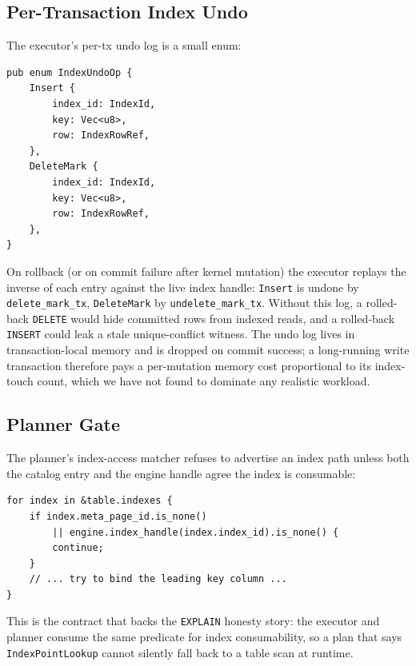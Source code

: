 \subsection{Per-Transaction Index Undo}
The executor's per-tx undo log is a small enum:

\begin{lstlisting}
pub enum IndexUndoOp {
    Insert {
        index_id: IndexId,
        key: Vec<u8>,
        row: IndexRowRef,
    },
    DeleteMark {
        index_id: IndexId,
        key: Vec<u8>,
        row: IndexRowRef,
    },
}
\end{lstlisting}

On rollback (or on commit failure after kernel mutation) the executor
replays the inverse of each entry against the live index handle:
\texttt{Insert} is undone by \texttt{delete\_mark\_tx},
\texttt{DeleteMark} by \texttt{undelete\_mark\_tx}. Without this log,
a rolled-back \texttt{DELETE} would hide committed rows from indexed
reads, and a rolled-back \texttt{INSERT} could leak a stale
unique-conflict witness. The undo log lives in transaction-local
memory and is dropped on commit success; a long-running write
transaction therefore pays a per-mutation memory cost proportional
to its index-touch count, which we have not found to dominate any
realistic workload.

\subsection{Planner Gate}
The planner's index-access matcher refuses to advertise an index path
unless both the catalog entry and the engine handle agree the index
is consumable:

\begin{lstlisting}
for index in &table.indexes {
    if index.meta_page_id.is_none()
        || engine.index_handle(index.index_id).is_none() {
        continue;
    }
    // ... try to bind the leading key column ...
}
\end{lstlisting}

This is the contract that backs the \texttt{EXPLAIN} honesty story:
the executor and planner consume the same predicate for index
consumability, so a plan that says \texttt{IndexPointLookup} cannot
silently fall back to a table scan at runtime.

